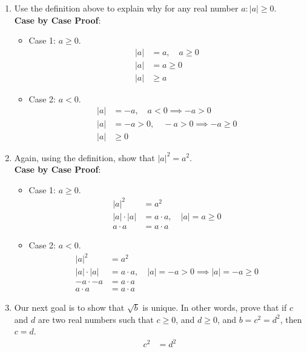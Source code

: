 \documentclass{article}
\begin{document}
\begin{enumerate}[label = \textbf{\alph*)}]
	\item Use the definition above to explain why for any real number $ a : \left| a \right| \geq 0 $. \\
		\textbf{Case by Case Proof}:
		\begin{itemize}
			\item Case 1: $ a \geq 0 $.
				\begin{align*}
					|a| & = a, \quad a \geq 0 \\
					|a| & = a \geq 0 \\
					|a| & \geq a
				\end{align*}
			\item Case 2: $ a < 0 $.
				\begin{align*}
					|a| & = -a, \quad a < 0 \implies -a > 0 \\
					|a| & = -a > 0, \quad -a > 0 \implies -a \geq 0 \\
					|a| & \geq 0
				\end{align*}
		\end{itemize}
	\item Again, using the definition, show that $ |a|^2 = a^2 $. \\
		\textbf{Case by Case Proof}:
		\begin{itemize}
			\item Case 1: $ a \geq 0 $.
				\begin{align*}
					|a|^2 & = a^2 \\
					|a| \cdot |a| & = a \cdot a, \quad |a| = a \geq 0 \\
					a \cdot a & = a \cdot a
				\end{align*}
			\item Case 2: $ a < 0 $.
				\begin{align*}
					|a|^2 & = a^2 \\
					|a| \cdot |a| & = a \cdot a, \quad |a| = -a > 0 \implies |a| = -a \geq 0 \\
					-a \cdot -a & = a \cdot a \\
					a \cdot a & = a \cdot a
				\end{align*}
		\end{itemize}
	\item Our next goal is to show that $ \sqrt{b} $ is unique. In other words, prove that if $ c $ and $ d $ are two real numbers such that $ c \geq 0 $, and $ d \geq 0 $, and $ b = c^2 = d^2 $, then $ c = d $.
		\begin{align*}
			c^2 & = d^2 \\

\end{align*}
\end{enumerate}
\end{document}
